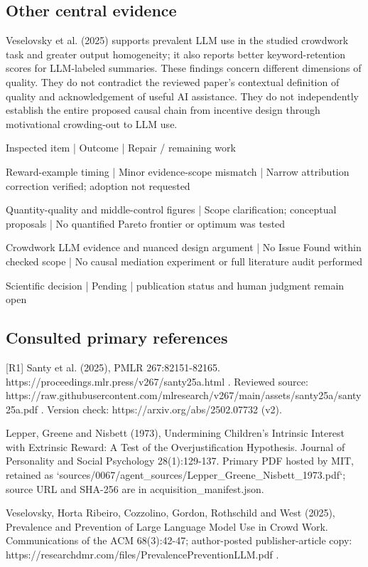 \documentclass[10pt]{article}
\begin{document}
\subsection*{Other central evidence}
Veselovsky et al. (2025) supports prevalent LLM use in the studied crowdwork task and greater output homogeneity; it also reports better keyword-retention scores for LLM-labeled summaries. These findings concern different dimensions of quality. They do not contradict the reviewed paper’s contextual definition of quality and acknowledgement of useful AI assistance. They do not independently establish the entire proposed causal chain from incentive design through motivational crowding-out to LLM use.\par
Inspected item | Outcome | Repair / remaining work\par
Reward-example timing | Minor evidence-scope mismatch | Narrow attribution correction verified; adoption not requested\par
Quantity-quality and middle-control figures | Scope clarification; conceptual proposals | No quantified Pareto frontier or optimum was tested\par
Crowdwork LLM evidence and nuanced design argument | No Issue Found within checked scope | No causal mediation experiment or full literature audit performed\par
Scientific decision | Pending | publication status and human judgment remain open\par
\subsection*{Consulted primary references}
[R1] Santy et al. (2025), PMLR 267:82151-82165. https://proceedings.mlr.press/v267/santy25a.html . Reviewed source: https://raw.githubusercontent.com/mlresearch/v267/main/assets/santy25a/santy25a.pdf . Version check: https://arxiv.org/abs/2502.07732 (v2).\par
[R2] Lepper, Greene and Nisbett (1973), Undermining Children’s Intrinsic Interest with Extrinsic Reward: A Test of the Overjustification Hypothesis. Journal of Personality and Social Psychology 28(1):129-137. Primary PDF hosted by MIT, retained as `sources/0067/agent\_sources/Lepper\_Greene\_Nisbett\_1973.pdf`; source URL and SHA-256 are in acquisition\_manifest.json.\par
[R3] Veselovsky, Horta Ribeiro, Cozzolino, Gordon, Rothschild and West (2025), Prevalence and Prevention of Large Language Model Use in Crowd Work. Communications of the ACM 68(3):42-47; author-posted publisher-article copy: https://researchdmr.com/files/PrevalencePreventionLLM.pdf .\par
\end{document}
